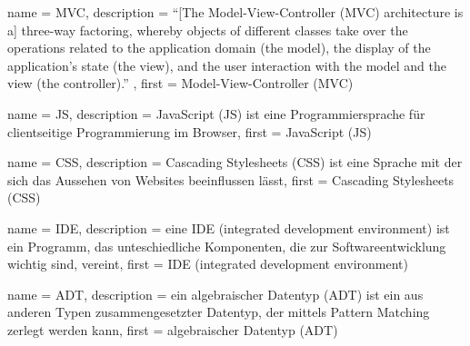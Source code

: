 






{
  name        = MVC,
  description = {"`[The Model-View-Controller (MVC) architecture is a] three-way factoring, whereby objects of different classes take over the operations related to the application domain (the model), the display of the application's state (the view), and the user interaction with the model and the view (the controller)."' \cite[vgl.][S.~1]{mvc}},
  first       = {Model-View-Controller (MVC)}
}


{
  name        = JS,
  description = {JavaScript (JS) ist eine Programmiersprache für clientseitige Programmierung im Browser},
  first       = {JavaScript (JS)}
}


{
  name        = CSS,
  description = {Cascading Stylesheets (CSS) ist eine Sprache mit der sich das Aussehen von Websites beeinflussen lässt},
  first       = {Cascading Stylesheets (CSS)}
}


{
  name        = IDE,
  description = {eine IDE (integrated development environment) ist ein Programm, das unteschiedliche Komponenten, die zur Softwareentwicklung wichtig sind, vereint},
  first       = {IDE (integrated development environment)}
}


{
  name        = ADT,
  description = {ein algebraischer Datentyp (ADT) ist ein aus anderen Typen zusammengesetzter Datentyp, der mittels Pattern Matching zerlegt werden kann},
  first       = {algebraischer Datentyp (ADT)}
}
